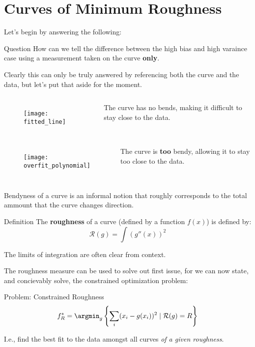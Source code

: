 \section{Curves of Minimum Roughness}
%
%
\begin{frame}
  Let's begin by answering the following:
  \begin{block}{Question}
    How can we tell the difference between the high bias and high varaince case using a measurement taken on the curve \textbf{only}.
  \end{block}
  Clearly this can only be truly answered by referencing both the curve and the data, but let's put that aside for the moment.
\end{frame}
%
%
\begin{frame}
  \begin{columns}
      \begin{figure}
        \texttt{[image: fitted\_line]}
      \end{figure}
      The curve has no bends, making it difficult to stay close to the data.
  \end{columns}
\end{frame}
%
%
\begin{frame}
  \begin{columns}
      \begin{figure}
        \texttt{[image: overfit\_polynomial]}
      \end{figure}
      The curve is \textbf{too} bendy, allowing it to stay too close to the data.
  \end{columns}
\end{frame}
%
%
\begin{frame}
  Bendyness of a curve is an informal notion that roughly corresponds to the total ammount that the curve changes direction.
\end{frame}
%
%
\begin{frame}
  \begin{block}{Definition}
    The \textbf{roughness} of a curve (defined by a function $f(x)$) is defined by:
    $$ \mathcal{R}(g) = \int (g''(x))^2 $$
  \end{block}
  The limits of integration are often clear from context.
\end{frame}
%
%
\begin{frame}
  The roughness measure can be used to solve out first issue, for we can now state, and concievably solve, the constrained optimization problem:
  \begin{block}{Problem: Constrained Roughness}
    $$ f_R^* = \argmin_{g} \left\{ \sum_i (x_i - g(x_i))^2 \mid \mathcal{R}(g) = R \right\} $$
  \end{block}
  I.e., find the best fit to the data amongst all curves \textit{of a given roughness}.
\end{frame}
